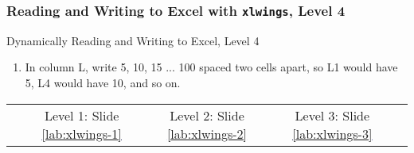 \documentclass[handout, 11pt]{beamer}
\begin{document}
\begin{frame}
\frametitle{Reading and Writing to Excel with \texttt{xlwings}, Level 4}
{
\begin{block}{Dynamically Reading and Writing to Excel, Level 4}
\begin{enumerate}
\item In column L, write 5, 10, 15 ... 100 spaced two cells apart, so L1 would have 5, L4 would have 10, and so on.
\end{enumerate}
\vfill
\begin{tabular*}{\textwidth}{@{\extracolsep{\fill}}ccccc}
\toprule
\hfill & Level 1: Slide \textcolor{blue}{\underline{\ref{lab:xlwings-1}}} & Level 2: Slide \textcolor{blue}{\underline{\ref{lab:xlwings-2}}} & Level 3: Slide \textcolor{blue}{\underline{\ref{lab:xlwings-3}}} & \hfill\\

\end{tabular*}
\end{block}
}
\label{lab:xlwings-4}
\end{frame}
\setcounter{framenumber}{\value{finalframe}}
\end{document}
